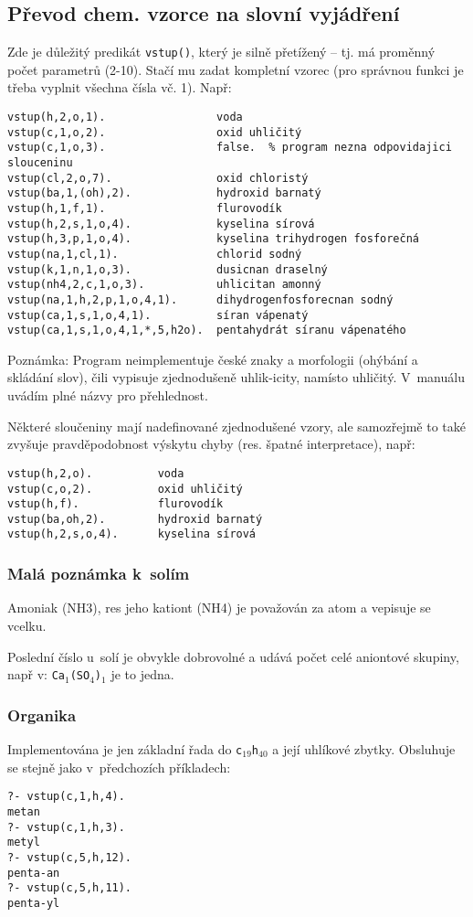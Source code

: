 \documentclass[a4paper]{article}
\begin{document}
\subsection{Převod chem. vzorce na slovní vyjádření}
Zde je důležitý predikát \texttt{vstup()}, který je silně přetížený -- tj. má proměnný počet parametrů (2-10). Stačí mu zadat kompletní vzorec (pro správnou funkci je třeba vyplnit všechna čísla vč. 1). Např:
\begin{verbatim}
vstup(h,2,o,1).                 voda
vstup(c,1,o,2).                 oxid uhličitý
vstup(c,1,o,3).	                false.  % program nezna odpovidajici slouceninu
vstup(cl,2,o,7).                oxid chloristý
vstup(ba,1,(oh),2).             hydroxid barnatý
vstup(h,1,f,1).                 flurovodík
vstup(h,2,s,1,o,4).             kyselina sírová
vstup(h,3,p,1,o,4).             kyselina trihydrogen fosforečná
vstup(na,1,cl,1).               chlorid sodný
vstup(k,1,n,1,o,3).             dusicnan draselný
vstup(nh4,2,c,1,o,3).           uhlicitan amonný
vstup(na,1,h,2,p,1,o,4,1).      dihydrogenfosforecnan sodný
vstup(ca,1,s,1,o,4,1).          síran vápenatý
vstup(ca,1,s,1,o,4,1,*,5,h2o).  pentahydrát síranu vápenatého
\end{verbatim}
Poznámka: Program neimplementuje české znaky a morfologii (ohýbání a skládání slov), čili vypisuje zjednodušeně uhlik-icity, namísto uhličitý. V~manuálu uvádím plné názvy pro přehlednost.

Některé sloučeniny mají nadefinované zjednodušené vzory, ale samozřejmě to také zvyšuje pravděpodobnost výskytu chyby (res. špatné interpretace), např:
\begin{verbatim}
vstup(h,2,o).          voda
vstup(c,o,2).          oxid uhličitý
vstup(h,f).            flurovodík
vstup(ba,oh,2).        hydroxid barnatý
vstup(h,2,s,o,4).      kyselina sírová
\end{verbatim}
\subsubsection{Malá poznámka k~solím}
Amoniak (NH3), res jeho kationt (NH4) je považován za atom a vepisuje se vcelku.

Poslední číslo u~solí je obvykle dobrovolné a udává počet celé aniontové skupiny, např v: \texttt{Ca$_1$(SO$_4$)$_1$} je to jedna.
\subsubsection{Organika}
Implementována je jen základní řada do \texttt{c$_{19}$h$_{40}$} a její uhlíkové zbytky. Obsluhuje se stejně jako v~předchozích příkladech:
\begin{verbatim}
?- vstup(c,1,h,4).
metan
?- vstup(c,1,h,3).
metyl
?- vstup(c,5,h,12).
penta-an
?- vstup(c,5,h,11).
penta-yl
\end{verbatim}
\end{document}
